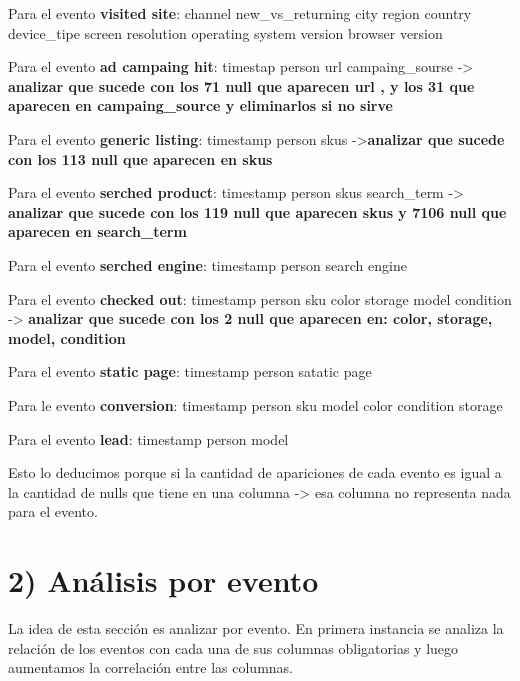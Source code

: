 \documentclass[11pt]{article}
\begin{document}
Para el evento \textbf{visited site}: channel \textbar{}
new\_vs\_returning \textbar{} city \textbar{} region \textbar{} country
\textbar{} device\_tipe \textbar{} screen resolution \textbar{}
operating system version \textbar{} browser version

Para el evento \textbf{ad campaing hit}: timestap \textbar{} person
\textbar{} url \textbar{} campaing\_sourse -\textgreater{}
\textbf{analizar que sucede con los 71 null que aparecen url , y los 31
que aparecen en campaing\_source y eliminarlos si no sirve}

Para el evento \textbf{generic listing}: timestamp \textbar{} person
\textbar{} skus -\textgreater{}\textbf{analizar que sucede con los 113
null que aparecen en skus}

Para el evento \textbf{serched product}: timestamp \textbar{} person
\textbar{} skus \textbar{} search\_term -\textgreater{} \textbf{analizar
que sucede con los 119 null que aparecen skus y 7106 null que aparecen
en search\_term}

Para el evento \textbf{serched engine}: timestamp \textbar{} person
\textbar{} search engine

Para el evento \textbf{checked out}: timestamp \textbar{} person
\textbar{} sku \textbar{} color \textbar{} storage \textbar{} model
\textbar{} condition -\textgreater{} \textbf{analizar que sucede con los
2 null que aparecen en: color, storage, model, condition}

Para el evento \textbf{static page}: timestamp \textbar{} person
\textbar{} satatic page

Para le evento \textbf{conversion}: timestamp \textbar{} person
\textbar{} sku \textbar{} model \textbar{} color \textbar{} condition
\textbar{} storage

Para el evento \textbf{lead}: timestamp \textbar{} person \textbar{}
model

Esto lo deducimos porque si la cantidad de apariciones de cada evento es
igual a la cantidad de nulls que tiene en una columna -\textgreater{}
esa columna no representa nada para el evento.

    \section{2) Análisis por evento}\label{anuxe1lisis-por-evento}

La idea de esta sección es analizar por evento. En primera instancia se
analiza la relación de los eventos con cada una de sus columnas
obligatorias y luego aumentamos la correlación entre las columnas.
\end{document}
